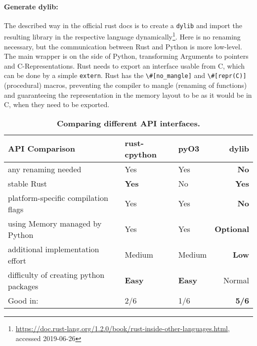 \paragraph{Generate dylib:} The described way in the official rust docs is to
create a \verb|dylib| and import the resulting library in the respective
language
dynamically\footnote{\url{https://doc.rust-lang.org/1.2.0/book/rust-inside-other-languages.html}, \\
accessed 2019-06-26}.  Here is no renaming necessary, but the
communication between Rust and Python is more low-level. The main wrapper
is on the side of Python, transforming Arguments to pointers and
C-Representations. Rust needs to export an interface usable from C, which can
be done by a simple \verb|extern|. Rust has the \verb!\#[no_mangle]! and
\verb!\#[repr(C)]! (procedural) macros, preventing the compiler to mangle
(renaming of functions) and guaranteeing the representation in the memory
layout to be as it would be in C, when they need to be exported.


\begin{table}[ht]
\begin{tabular}{@{}lllr@{}}
    \textbf{API Comparison} & rust-cpython & pyO3 & dylib \\
    \midrule
    any renaming needed             & Yes    & Yes & \textbf{No} \\
    stable Rust                     & \textbf{Yes}    & No  & \textbf{Yes} \\
    platform-specific compilation flags & Yes & Yes & \textbf{No} \\
    using Memory managed by Python  & Yes    & Yes & \textbf{Optional} \\
    additional implementation effort                 & Medium & Medium & \textbf{Low} \\
    difficulty of creating python packages        & \textbf{Easy}\footnotemark  & \textbf{Easy}\footnotemark[\value{footnote}] & Normal \\
    \midrule
    Good in: & 2/6 & 1/6 & \textbf{5/6} \\
\end{tabular}
    \caption[Comparison of different Interfaces between Rust and Python]{\textbf{Comparing different API interfaces.}}
    \label{tab:interfaces}
\end{table}


